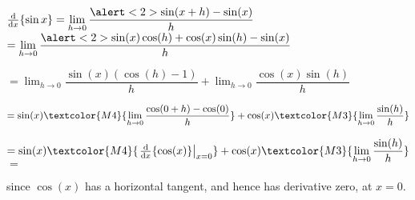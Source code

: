 \begin{frame}[t]\small
$\diff{}{x}\{\sin x\} = \displaystyle\lim_{h \rightarrow 0 } \frac{\alert<2>{\sin(x+h)}-\sin(x)}{h}$\ \pause\vfill
$=\displaystyle\lim_{h \rightarrow 0 } \dfrac{\alert<2>{\sin(x)\cos(h)+\cos(x)\sin(h)}-\sin(x)}{h}$\pause \vfill


$=\displaystyle\lim_{h \rightarrow 0} 
\dfrac{\sin(x)(\cos(h)-1)}{h}
+\displaystyle\lim_{h \rightarrow 0} \dfrac{\cos(x)\sin(h)}{h}$\pause\vfill


$=\sin (x) \textcolor{M4}{\displaystyle\lim_{h \rightarrow 0}
\dfrac{\cos(0+h)-\cos(0)}{h}} + \cos(x)
\textcolor{M3}{\displaystyle\lim_{h \rightarrow 0 }\dfrac{\sin(h)}{h}}$\pause\vfill

$=\sin(x)\textcolor{M4}{\left.\diff{}{x}\{\cos(x)\}\right\vert_{x=0}} +
\cos(x)
\textcolor{M3}{\displaystyle\lim_{h \rightarrow 0 }\dfrac{\sin(h)}{h}}$ \pause \hfill $=$ \hfill
{}

\vfill
since $\cos(x)$ has a horizontal tangent, and hence has derivative zero, at $x=0$. 
\end{frame}
